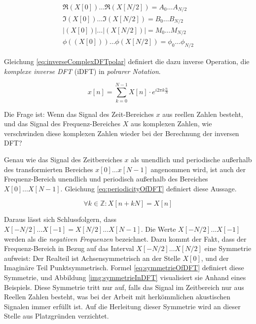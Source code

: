 \begin{equation}
\begin{gathered}
\Re(X[0]) \ldots \Re(X[N/2]) = A_0 \ldots A_{N/2} \\
\Im(X[0]) \ldots \Im(X[N/2]) = B_0 \ldots B_{N/2}  \\
|(X[0])| \ldots |(X[N/2])| = M_0 \ldots M_{N/2} \\
\phi((X[0])) \ldots \phi(X[N/2]) = \phi_0 \ldots \phi_{N/2} 
\end{gathered}
\label{eq:relationOfRealAndComplexDFT}
\end{equation}

Gleichung \ref{eq:inverseComplexDFTpolar} definiert die dazu inverse Operation, die \emph{komplexe inverse DFT} (iDFT) in \emph{polrarer Notation}. \cite[S. 572]{dspGuide}

\begin{equation}
\label{eq:inverseComplexDFTpolar}
x[n] =  \sum_{k = 0}^{N-1}  X[n] \cdot e^{i 2\pi k \frac{n}{N}}
\end{equation}

Die Frage ist: Wenn das Signal des Zeit-Bereiches $x$  aus reellen Zahlen besteht, und das Signal des Frequenz-Bereiches $X$ aus komplexen Zahlen, wie \glqq verschwinden \glqq{} diese komplexen Zahlen wieder bei der Berechnung der inversen DFT? 

Genau wie das Signal des Zeitbereiches $x$ als unendlich und periodische außerhalb des transformierten Bereiches $x[0] \ldots x[N-1]$ angenommen wird, ist auch der Frequenz-Bereich unendlich und periodisch außerhalb des Bereiches $X[0] \ldots X[N-1] $. Gleichung  \ref{eq:periodicityOfDFT}  definiert diese Aussage. \cite[S. 572]{dspGuide}

\begin{equation}
\label{eq:periodicityOfDFT}
\forall k \in \mathbb{Z}: X[n+kN] = X[n]
\end{equation}

Daraus lässt sich Schlussfolgern, dass $X[-N/2] \ldots X[-1] = X[N/2] ... X[N-1]$. Die Werte $X[-N/2] ... X[-1]$ werden als die \emph{negativen Frequenzen} bezeichnet. Dazu kommt der Fakt, dass der Frequenz-Bereich in Bezug auf das Interval $X[-N/2] \ldots X[N/2]$ eine Symmetrie aufweist: Der Realteil ist Achsensymmetrisch an der Stelle $X[0]$, und der Imaginäre Teil Punktsymmetrisch. Formel \ref{eq:symmetrieOfDFT} definiert diese Symmetrie, und Abbildung \ref{img:symmetrieInDFT} visualisiert sie Anhand eines Beispiels.  Diese Symmetrie tritt nur auf, falls das Signal im Zeitbereich nur aus Reellen Zahlen besteht, was bei der Arbeit mit  herkömmlichen akustischen Signalen immer erfüllt ist. Auf die Herleitung dieser Symmetrie wird an dieser Stelle aus Platzgründen verzichtet. \cite[S. 574]{dspGuide}


